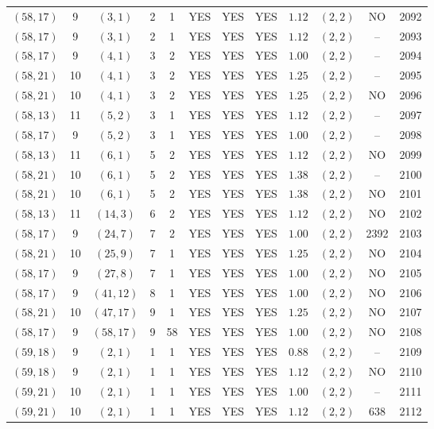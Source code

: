 \begin{longtable}{|c|c|c|c|c|c|c|c|c|c|c|c|}
$(58,17)$ & 9 & $(3,1)$ & 2 & 1 & YES & YES & YES & $1.12$ & $(2,2)$ & NO & 2092\\
$(58,17)$ & 9 & $(3,1)$ & 2 & 1 & YES & YES & YES & $1.12$ & $(2,2)$ & -- & 2093\\
$(58,17)$ & 9 & $(4,1)$ & 3 & 2 & YES & YES & YES & $1.00$ & $(2,2)$ & -- & 2094\\
$(58,21)$ & 10 & $(4,1)$ & 3 & 2 & YES & YES & YES & $1.25$ & $(2,2)$ & -- & 2095\\
$(58,21)$ & 10 & $(4,1)$ & 3 & 2 & YES & YES & YES & $1.25$ & $(2,2)$ & NO & 2096\\
$(58,13)$ & 11 & $(5,2)$ & 3 & 1 & YES & YES & YES & $1.12$ & $(2,2)$ & -- & 2097\\
$(58,17)$ & 9 & $(5,2)$ & 3 & 1 & YES & YES & YES & $1.00$ & $(2,2)$ & -- & 2098\\
$(58,13)$ & 11 & $(6,1)$ & 5 & 2 & YES & YES & YES & $1.12$ & $(2,2)$ & NO & 2099\\
$(58,21)$ & 10 & $(6,1)$ & 5 & 2 & YES & YES & YES & $1.38$ & $(2,2)$ & -- & 2100\\
$(58,21)$ & 10 & $(6,1)$ & 5 & 2 & YES & YES & YES & $1.38$ & $(2,2)$ & NO & 2101\\
$(58,13)$ & 11 & $(14,3)$ & 6 & 2 & YES & YES & YES & $1.12$ & $(2,2)$ & NO & 2102\\
$(58,17)$ & 9 & $(24,7)$ & 7 & 2 & YES & YES & YES & $1.00$ & $(2,2)$ & 2392 & 2103\\
$(58,21)$ & 10 & $(25,9)$ & 7 & 1 & YES & YES & YES & $1.25$ & $(2,2)$ & NO & 2104\\
$(58,17)$ & 9 & $(27,8)$ & 7 & 1 & YES & YES & YES & $1.00$ & $(2,2)$ & NO & 2105\\
$(58,17)$ & 9 & $(41,12)$ & 8 & 1 & YES & YES & YES & $1.00$ & $(2,2)$ & NO & 2106\\
$(58,21)$ & 10 & $(47,17)$ & 9 & 1 & YES & YES & YES & $1.25$ & $(2,2)$ & NO & 2107\\
$(58,17)$ & 9 & $(58,17)$ & 9 & 58 & YES & YES & YES & $1.00$ & $(2,2)$ & NO & 2108\\
$(59,18)$ & 9 & $(2,1)$ & 1 & 1 & YES & YES & YES & $0.88$ & $(2,2)$ & -- & 2109\\
$(59,18)$ & 9 & $(2,1)$ & 1 & 1 & YES & YES & YES & $1.12$ & $(2,2)$ & NO & 2110\\
$(59,21)$ & 10 & $(2,1)$ & 1 & 1 & YES & YES & YES & $1.00$ & $(2,2)$ & -- & 2111\\
$(59,21)$ & 10 & $(2,1)$ & 1 & 1 & YES & YES & YES & $1.12$ & $(2,2)$ & 638 & 2112\\

\end{longtable}
